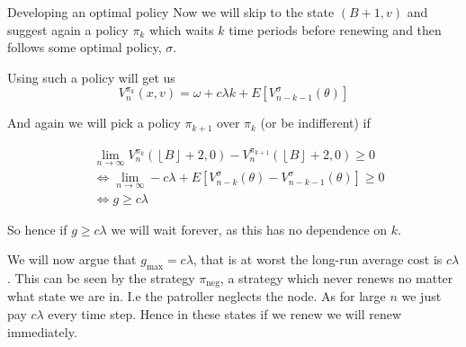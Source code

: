 \documentclass[10pt]{beamer}
\newcommand{\floor}[1]{\left \lfloor #1 \right \rfloor}
\begin{document}
\begin{frame}{Developing an optimal policy}
Now we will skip to the state $(B+1,v)$ and suggest again a policy $\pi_{k}$ which waits $k$ time periods before renewing and then follows some optimal policy, $\sigma$.

Using such a policy will get us
\begin{equation}
V_{n}^{\pi_{k}}(x,v)= \omega +c \lambda k + E[V_{n-k-1}^{\sigma}(\theta)]
\end{equation}

And again we will pick a policy $\pi_{k+1}$ over $\pi_{k}$ (or be indifferent) if

\begin{align*}
&\lim\limits_{n \rightarrow \infty} V_{n}^{\pi_{k}} (\floor{B}+2,0) - V_{n}^{\pi_{k+1}}(\floor{B}+2,0) \geq 0 \\
& \iff \lim\limits_{n \rightarrow \infty} -c \lambda + E[V_{n-k}^{\sigma}(\theta) - V_{n-k-1}^{\sigma}(\theta)] \geq 0 \\
& \iff g \geq c \lambda
\end{align*}

So hence if $g \geq c \lambda$ we will wait forever, as this has no dependence on $k$.

We will now argue that $g_{\text{max}}=c \lambda$, that is at worst the  long-run average cost is $c \lambda$. This can be seen by the strategy $\pi_{\text{neg}}$, a strategy which never renews no matter what state we are in. I.e the patroller neglects the node. As for large $n$ we just pay $c \lambda$ every time step. Hence in these states if we renew we will renew immediately.
\end{frame}
\end{document}
